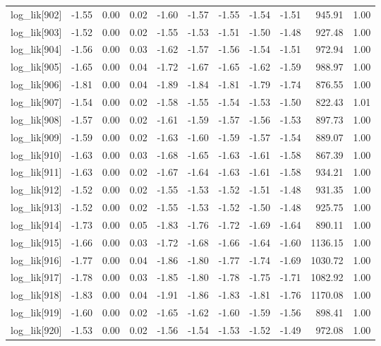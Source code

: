 \begin{table}[ht]
\begin{tabular}{rrrrrrrrrrr}
  log\_lik[902] & -1.55 & 0.00 & 0.02 & -1.60 & -1.57 & -1.55 & -1.54 & -1.51 & 945.91 & 1.00 \\ 
  log\_lik[903] & -1.52 & 0.00 & 0.02 & -1.55 & -1.53 & -1.51 & -1.50 & -1.48 & 927.48 & 1.00 \\ 
  log\_lik[904] & -1.56 & 0.00 & 0.03 & -1.62 & -1.57 & -1.56 & -1.54 & -1.51 & 972.94 & 1.00 \\ 
  log\_lik[905] & -1.65 & 0.00 & 0.04 & -1.72 & -1.67 & -1.65 & -1.62 & -1.59 & 988.97 & 1.00 \\ 
  log\_lik[906] & -1.81 & 0.00 & 0.04 & -1.89 & -1.84 & -1.81 & -1.79 & -1.74 & 876.55 & 1.00 \\ 
  log\_lik[907] & -1.54 & 0.00 & 0.02 & -1.58 & -1.55 & -1.54 & -1.53 & -1.50 & 822.43 & 1.01 \\ 
  log\_lik[908] & -1.57 & 0.00 & 0.02 & -1.61 & -1.59 & -1.57 & -1.56 & -1.53 & 897.73 & 1.00 \\ 
  log\_lik[909] & -1.59 & 0.00 & 0.02 & -1.63 & -1.60 & -1.59 & -1.57 & -1.54 & 889.07 & 1.00 \\ 
  log\_lik[910] & -1.63 & 0.00 & 0.03 & -1.68 & -1.65 & -1.63 & -1.61 & -1.58 & 867.39 & 1.00 \\ 
  log\_lik[911] & -1.63 & 0.00 & 0.02 & -1.67 & -1.64 & -1.63 & -1.61 & -1.58 & 934.21 & 1.00 \\ 
  log\_lik[912] & -1.52 & 0.00 & 0.02 & -1.55 & -1.53 & -1.52 & -1.51 & -1.48 & 931.35 & 1.00 \\ 
  log\_lik[913] & -1.52 & 0.00 & 0.02 & -1.55 & -1.53 & -1.52 & -1.50 & -1.48 & 925.75 & 1.00 \\ 
  log\_lik[914] & -1.73 & 0.00 & 0.05 & -1.83 & -1.76 & -1.72 & -1.69 & -1.64 & 890.11 & 1.00 \\ 
  log\_lik[915] & -1.66 & 0.00 & 0.03 & -1.72 & -1.68 & -1.66 & -1.64 & -1.60 & 1136.15 & 1.00 \\ 
  log\_lik[916] & -1.77 & 0.00 & 0.04 & -1.86 & -1.80 & -1.77 & -1.74 & -1.69 & 1030.72 & 1.00 \\ 
  log\_lik[917] & -1.78 & 0.00 & 0.03 & -1.85 & -1.80 & -1.78 & -1.75 & -1.71 & 1082.92 & 1.00 \\ 
  log\_lik[918] & -1.83 & 0.00 & 0.04 & -1.91 & -1.86 & -1.83 & -1.81 & -1.76 & 1170.08 & 1.00 \\ 
  log\_lik[919] & -1.60 & 0.00 & 0.02 & -1.65 & -1.62 & -1.60 & -1.59 & -1.56 & 898.41 & 1.00 \\ 
  log\_lik[920] & -1.53 & 0.00 & 0.02 & -1.56 & -1.54 & -1.53 & -1.52 & -1.49 & 972.08 & 1.00 \\ 

\end{tabular}
\end{table}
